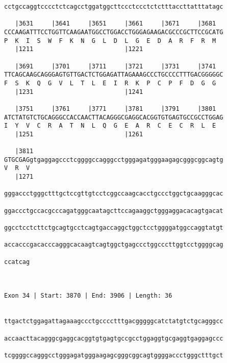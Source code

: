 \documentclass{article}
\begin{document}
\begin{Verbatim}
cctgccaggtcccctctcagcctggatggcttccctccctctctttaccttatttatagc
                                                            
   |3631     |3641     |3651     |3661     |3671     |3681  
CCCAAGATTTCCTGGTTCAAGAATGGCCTGGACCTGGGAGAAGACGCCCGCTTCCGCATG
P  K  I  S  W  F  K  N  G  L  D  L  G  E  D  A  R  F  R  M  
   |1211                         |1221                      
  
   |3691     |3701     |3711     |3721     |3731     |3741  
TTCAGCAAGCAGGGAGTGTTGACTCTGGAGATTAGAAAGCCCTGCCCCTTTGACGGGGGC
F  S  K  Q  G  V  L  T  L  E  I  R  K  P  C  P  F  D  G  G  
   |1231                         |1241                      
  
   |3751     |3761     |3771     |3781     |3791     |3801  
ATCTATGTCTGCAGGGCCACCAACTTACAGGGCGAGGCACGGTGTGAGTGCCGCCTGGAG
I  Y  V  C  R  A  T  N  L  Q  G  E  A  R  C  E  C  R  L  E  
   |1251                         |1261                      
  
   |3811                                                    
GTGCGAGgtgaggagccctcggggccagggcctgggagatgggaagagcgggcggcagtg
V  R  V                                                     
   |1271                                                    
  
gggaccctgggctttgctccgttgtcctcggccaagcacctgccctggctgcaagggcac
                                                            
ggaccctgccacgcccagatgggcaatagcttccagaaggctgggaggacacagtgacat
                                                            
ggcctcctcttctgcagtgcctcagtgaccaggctggctcctggggatggccaggtatgt
                                                            
accacccgacacccagggcacaagtcagtggctgagccctggcccttggtcctggggcag
                                                            
ccatcag
       
       
 
Exon 34 | Start: 3870 | End: 3906 | Length: 36


ttgactctggagattagaaagccctgcccctttgacgggggcatctatgtctgcagggcc
                                                            
accaacttacagggcgaggcacggtgtgagtgccgcctggaggtgcgaggtgaggagccc
                                                            
tcggggccagggcctgggagatgggaagagcgggcggcagtggggaccctgggctttgct
                                                            

\end{Verbatim}
\end{document}
